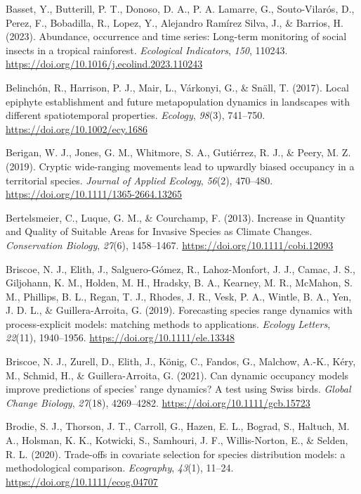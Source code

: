 \documentclass[
]{article}
\newlength{\cslhangindent}
\newenvironment{CSLReferences}[2] %
 {\begin{list}{}{%
  \setlength{\itemindent}{0pt}
  \setlength{\leftmargin}{0pt}
  \setlength{\parsep}{0pt}
  \ifodd #1
   \setlength{\leftmargin}{\cslhangindent}
   \setlength{\itemindent}{-1\cslhangindent}
  \fi
  \setlength{\itemsep}{#2\baselineskip}}}
 {\end{list}}
\begin{document}
\begin{CSLReferences}{1}{0}
Basset, Y., Butterill, P. T., Donoso, D. A., P. A. Lamarre, G.,
Souto-Vilarós, D., Perez, F., Bobadilla, R., Lopez, Y., Alejandro
Ramírez Silva, J., \& Barrios, H. (2023). Abundance, occurrence and time
series: Long-term monitoring of social insects in a tropical rainforest.
\emph{Ecological Indicators}, \emph{150}, 110243.
\url{https://doi.org/10.1016/j.ecolind.2023.110243}

Belinchón, R., Harrison, P. J., Mair, L., Várkonyi, G., \& Snäll, T.
(2017). Local epiphyte establishment and future metapopulation dynamics
in landscapes with different spatiotemporal properties. \emph{Ecology},
\emph{98}(3), 741--750. \url{https://doi.org/10.1002/ecy.1686}

Berigan, W. J., Jones, G. M., Whitmore, S. A., Gutiérrez, R. J., \&
Peery, M. Z. (2019). Cryptic wide-ranging movements lead to upwardly
biased occupancy in a territorial species. \emph{Journal of Applied
Ecology}, \emph{56}(2), 470--480.
\url{https://doi.org/10.1111/1365-2664.13265}

Bertelsmeier, C., Luque, G. M., \& Courchamp, F. (2013). Increase in
Quantity and Quality of Suitable Areas for Invasive Species as Climate
Changes. \emph{Conservation Biology}, \emph{27}(6), 1458--1467.
\url{https://doi.org/10.1111/cobi.12093}

Briscoe, N. J., Elith, J., Salguero-Gómez, R., Lahoz-Monfort, J. J.,
Camac, J. S., Giljohann, K. M., Holden, M. H., Hradsky, B. A., Kearney,
M. R., McMahon, S. M., Phillips, B. L., Regan, T. J., Rhodes, J. R.,
Vesk, P. A., Wintle, B. A., Yen, J. D. L., \& Guillera-Arroita, G.
(2019). Forecasting species range dynamics with process-explicit models:
matching methods to applications. \emph{Ecology Letters}, \emph{22}(11),
1940--1956. \url{https://doi.org/10.1111/ele.13348}

Briscoe, N. J., Zurell, D., Elith, J., König, C., Fandos, G., Malchow,
A.-K., Kéry, M., Schmid, H., \& Guillera-Arroita, G. (2021). Can dynamic
occupancy models improve predictions of species' range dynamics? A test
using Swiss birds. \emph{Global Change Biology}, \emph{27}(18),
4269--4282. \url{https://doi.org/10.1111/gcb.15723}

Brodie, S. J., Thorson, J. T., Carroll, G., Hazen, E. L., Bograd, S.,
Haltuch, M. A., Holsman, K. K., Kotwicki, S., Samhouri, J. F.,
Willis-Norton, E., \& Selden, R. L. (2020). Trade-offs in covariate
selection for species distribution models: a methodological comparison.
\emph{Ecography}, \emph{43}(1), 11--24.
\url{https://doi.org/10.1111/ecog.04707}


\end{CSLReferences}
\end{document}
